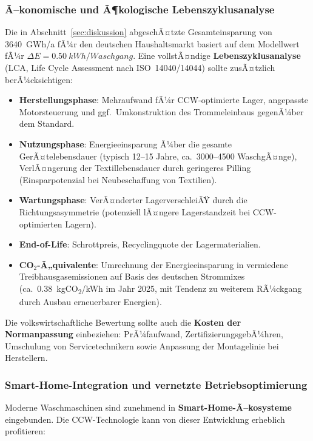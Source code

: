 ﻿\documentclass[12pt,a4paper]{article}
\theoremstyle{remark}
\begin{document}
	\subsubsection{Ã–konomische und Ã¶kologische Lebenszyklusanalyse}
	
	Die in Abschnitt~\ref{sec:diskussion} abgeschÃ¤tzte Gesamteinsparung von
	\SI{3640}{GWh/a} fÃ¼r den deutschen Haushaltsmarkt basiert auf dem Modellwert fÃ¼r
	$\Delta E = \SI{0,50}{kWh/Waschgang}$. Eine vollstÃ¤ndige \textbf{Lebenszyklusanalyse}
	(LCA, Life Cycle Assessment nach ISO~14040/14044) sollte zusÃ¤tzlich berÃ¼cksichtigen:
	
	\begin{itemize}
		\item \textbf{Herstellungsphase}: Mehraufwand fÃ¼r CCW-optimierte Lager, angepasste
		Motorsteuerung und ggf.\ Umkonstruktion des Trommeleinbaus gegenÃ¼ber dem Standard.
		\item \textbf{Nutzungsphase}: Energieeinsparung Ã¼ber die gesamte GerÃ¤telebensdauer
		(typisch 12--15 Jahre, ca.\ 3000--4500 WaschgÃ¤nge), VerlÃ¤ngerung der Textillebensdauer
		durch geringeres Pilling (Einsparpotenzial bei Neubeschaffung von Textilien).
		\item \textbf{Wartungsphase}: VerÃ¤nderter LagerverschleiÃŸ durch die Richtungs\-asymme\-trie
		(potenziell lÃ¤ngere Lagerstandzeit bei CCW-optimierten Lagern).
		\item \textbf{End-of-Life}: Schrottpreis, Recyclingquote der Lagermaterialien.
		\item \textbf{CO$_2$-Ã„quivalente}: Umrechnung der Energieeinsparung in vermiedene
		Treibhausgasemissionen auf Basis des deutschen Strommixes (ca.\ \SI{0,38}{kgCO_2/kWh}
		im Jahr 2025, mit Tendenz zu weiterem RÃ¼ckgang durch Ausbau erneuerbarer Energien).
	\end{itemize}
	
	Die volkswirtschaftliche Bewertung sollte auch die \textbf{Kosten der Normanpassung}
	einbeziehen: PrÃ¼faufwand, ZertifizierungsgebÃ¼hren, Umschulung von Servicetechnikern
	sowie Anpassung der Montagelinie bei Herstellern.
	
	\subsubsection{Smart-Home-Integration und vernetzte Betriebsoptimierung}
	
	Moderne Waschmaschinen sind zunehmend in \textbf{Smart-Home-Ã–kosysteme} eingebunden.
	Die CCW-Technologie kann von dieser Entwicklung erheblich profitieren:
	
\end{document}
